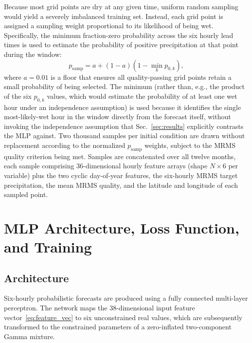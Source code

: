 \documentclass[11pt]{article}
\begin{document}
Because most grid points are dry at any given time, uniform random sampling
would yield a severely imbalanced training set.  Instead, each grid point is
assigned a sampling weight proportional to its likelihood of being wet.
Specifically, the minimum fraction-zero probability across the six hourly
lead times is used to estimate the probability of positive precipitation
at that point during the window:
\begin{equation}
  p_{\text{samp}} = a + (1-a)(1 - \min_k p_{0,k}),
  \label{eq:importance}
\end{equation}
where $a = 0.01$ is a floor that ensures all quality-passing grid points
retain a small probability of being selected.  The minimum (rather than,
e.g., the product of the six $p_{0,k}$ values, which would estimate the
probability of at least one wet hour under an independence assumption) is
used because it identifies the single most-likely-wet hour in the window
directly from the forecast itself, without invoking the independence
assumption that Sec.~\ref{sec:results} explicitly contrasts the MLP
against.  Two thousand samples
per initial condition are drawn without replacement according to the normalized
$p_{\text{samp}}$ weights, subject to the MRMS quality criterion being met.
Samples are concatenated over all twelve months, each
sample comprising 36-dimensional hourly feature arrays
(shape $N \times 6$ per variable) plus the two cyclic day-of-year features,
the six-hourly MRMS target precipitation,
the mean MRMS quality, and the latitude and longitude of each sampled point.

\section{MLP Architecture, Loss Function, and Training}
\label{sec:mlp}

\subsection{Architecture}
\label{sec:architecture}

Six-hourly probabilistic forecasts are produced using a fully connected
multi-layer perceptron.  The network maps the 38-dimensional
input feature vector~\eqref{eq:feature_vec} to six unconstrained real
values, which are subsequently transformed to the constrained parameters
of a zero-inflated two-component Gamma mixture.
\end{document}
